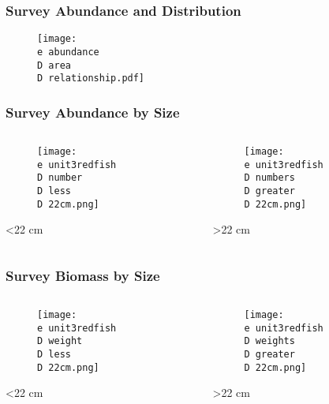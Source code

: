 \documentclass{beamer}
\begin{document}
\begin{frame}
\frametitle{Survey Abundance and Distribution}
\vspace*{-1cm}

\begin{figure}

 \centerline{\texttt{[image: \\e abundance\\D area\\D relationship.pdf]}}

 \end{figure}
 \end{frame}



\begin{frame}
\frametitle{Survey Abundance by Size}
\begin{columns}
	\begin{column}{.48\textwidth}
		\begin{figure}
		\centerline{\texttt{[image: \\e unit3redfish\\D number\\D less\\D 22cm.png]}}
		\end{figure}
		\centerline { \tiny{\textless  22 cm}}
	\end{column}

	\begin{column}{0.48\textwidth}
	\begin{figure}

 		\centerline{\texttt{[image: \\e unit3redfish\\D numbers\\D greater\\D 22cm.png]}}

 \end{figure}
\centerline { \tiny{\textgreater  22 cm}}
	 \end{column}
 \end{columns}
\end{frame}

\begin{frame}
\frametitle{Survey Biomass by Size}
\begin{columns}
	\begin{column}{.48\textwidth}
		\begin{figure}
		\centerline{\texttt{[image: \\e unit3redfish\\D weight\\D less\\D 22cm.png]}}
		\end{figure}
		\centerline { \tiny{\textless  22 cm}}
	\end{column}

	\begin{column}{0.48\textwidth}
	\begin{figure}

 		\centerline{\texttt{[image: \\e unit3redfish\\D weights\\D greater\\D 22cm.png]}}

 \end{figure}
\centerline { \tiny{\textgreater  22 cm}}
	 \end{column}
 \end{columns}
\end{frame}
\end{document}
